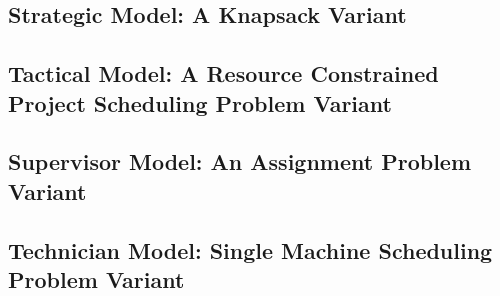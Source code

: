 \subsection{Strategic Model: A Knapsack Variant}
\label{sec:model:strategic}

\strategicmodel
\newpage
\subsection{Tactical Model: A Resource Constrained Project Scheduling Problem Variant}
\label{sec:model:tactical}

\newpage
\subsection{Supervisor Model: An Assignment Problem Variant}
\label{sec:model:supervisor}

\newpage
\subsection{Technician Model: Single Machine Scheduling Problem Variant}
\label{sec:model:technician}



